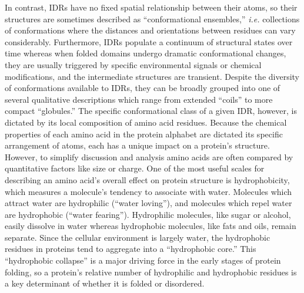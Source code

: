 In contrast, IDRs have no fixed spatial relationship between their atoms, so their structures are sometimes described as ``conformational ensembles,'' \textit{i.e.} collections of conformations where the distances and orientations between residues can vary considerably. Furthermore, IDRs populate a continuum of structural states over time whereas when folded domains undergo dramatic conformational changes, they are usually triggered by specific environmental signals or chemical modifications, and the intermediate structures are transient. Despite the diversity of conformations available to IDRs, they can be broadly grouped into one of several qualitative descriptions which range from extended ``coils'' to more compact ``globules.'' The specific conformational class of a given IDR, however, is dictated by its local composition of amino acid residues. Because the chemical properties of each amino acid in the protein alphabet are dictated its specific arrangement of atoms, each has a unique impact on a protein's structure. However, to simplify discussion and analysis amino acids are often compared by quantitative factors like size or charge. One of the most useful scales for describing an amino acid's overall effect on protein structure is hydrophobicity, which measures a molecule's tendency to associate with water. Molecules which attract water are hydrophilic (``water loving''), and molecules which repel water are hydrophobic (``water fearing''). Hydrophilic molecules, like sugar or alcohol, easily dissolve in water whereas hydrophobic molecules, like fats and oils, remain separate. Since the cellular environment is largely water, the hydrophobic residues in proteins tend to aggregate into a ``hydrophobic core.'' This ``hydrophobic collapse'' is a major driving force in the early stages of protein folding, so a protein's relative number of hydrophilic and hydrophobic residues is a key determinant of whether it is folded or disordered.

